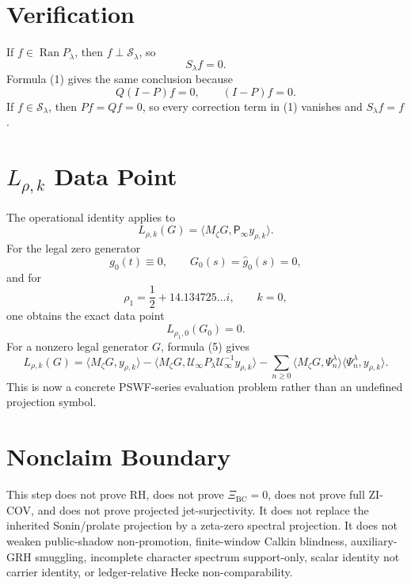\documentclass[11pt]{article}
\newcommand{\Psym}{\mathsf P_\infty}
\newcommand{\Uinf}{\mathcal U_\infty}
\newcommand{\Mz}{M_\zeta}
\newcommand{\Ran}{\operatorname{Ran}}
\begin{document}
\section{Verification}

If \(f\in\Ran P_\lambda\), then \(f\perp\mathcal S_\lambda\), so
\[
S_\lambda f=0.
\]
Formula (1) gives the same conclusion because
\[
Q(I-P)f=0,\qquad (I-P)f=0.
\]
If \(f\in\mathcal S_\lambda\), then \(Pf=Qf=0\), so every correction term in
(1) vanishes and \(S_\lambda f=f\).

\section{\texorpdfstring{\(L_{\rho,k}\)}{Lrho k} Data Point}

The operational identity applies to
\[
L_{\rho,k}(G)=\langle \Mz G,\Psym y_{\rho,k}\rangle.
\]
For the legal zero generator
\[
g_0(t)\equiv0,\qquad G_0(s)=\widehat g_0(s)=0,
\]
and for
\[
\rho_1=\frac12+14.134725\ldots i,\qquad k=0,
\]
one obtains the exact data point
\[
\boxed{
L_{\rho_1,0}(G_0)=0.
}
\]
For a nonzero legal generator \(G\), formula (5) gives
\[
L_{\rho,k}(G)
=
\langle \Mz G,y_{\rho,k}\rangle
-\langle \Mz G,\Uinf P_\lambda\Uinf^{-1}y_{\rho,k}\rangle
-\sum_{n\ge0}
\langle \Mz G,\Psi_n^\lambda\rangle
\langle \Psi_n^\lambda,y_{\rho,k}\rangle.
\]
This is now a concrete PSWF-series evaluation problem rather than an
undefined projection symbol.

\section{Nonclaim Boundary}

This step does not prove RH, does not prove \(\Xi_{\mathrm{BC}}=0\), does not
prove full ZI-COV, and does not prove projected jet-surjectivity.  It does not
replace the inherited Sonin/prolate projection by a zeta-zero spectral
projection.  It does not weaken public-shadow non-promotion, finite-window
Calkin blindness, auxiliary-GRH smuggling, incomplete character spectrum
support-only, scalar identity not carrier identity, or ledger-relative Hecke
non-comparability.
\end{document}
